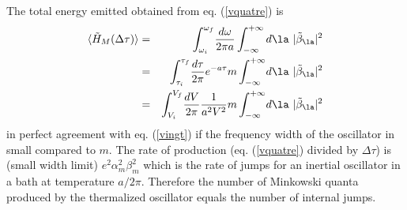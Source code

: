 \documentclass[12pt]{article}
\begin{document}
The total energy emitted obtained from eq. (\ref{vquatre}) is
\begin{eqnarray}
\bk{\tilde H_M( \Delta \tau)}  &=&  \int_{ \omega_i}^{ \omega_f}  \! { d
\omega \over 2 \pi a} \int_{-\infty}^{+\infty}  d\la\ | \tilde
\beta_{\la}|^2
\nonumber\\
&=& \int_{ \tau_i}^{ \tau_f}  \! { d \tau \over 2 \pi}
e^{-a\tau}
m \int_{-\infty}^{+\infty} \! d\la\ | \tilde
\beta_{\la}|^2
\nonumber\\ &=& \int_{V_i}^{V_f}  \! {d V \over 2 \pi}  {1 \over a^2V^2} m
\int_{-\infty}^{+\infty} \! d\la\ |
\tilde
\beta_{\la}|^2
\label{vcinq}
\end{eqnarray}
in perfect agreement with eq. (\ref{vingt}) if the frequency width
of the oscillator in small compared to $ m$.
The rate of production (eq. (\ref{vquatre}) divided by $ \Delta \tau$) is
(small width limit) ${e^2} \alpha _{m}^2
\beta_{m}^2$ which is the rate of jumps for an inertial
oscillator in a bath at temperature $a/2 \pi$. Therefore the number of
Minkowski quanta
produced by the thermalized oscillator equals the number of internal jumps.
\end{document}
